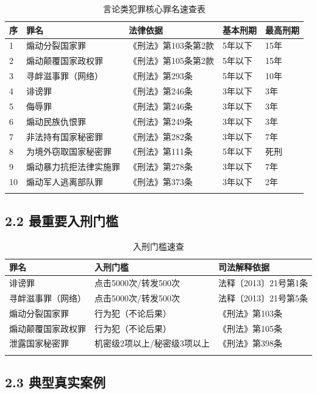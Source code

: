 \documentclass[12pt,a4paper]{article}
\begin{document}
\begin{longtable}{p{0.5cm}p{4cm}p{3cm}p{2cm}p{2cm}}
  \toprule
  \textbf{序} & \textbf{罪名} & \textbf{法律依据} & \textbf{基本刑期} & \textbf{最高刑期} \\
  \midrule
  1 & 煽动分裂国家罪 & 《刑法》第103条第2款 & 5年以下 & 15年 \\
  2 & 煽动颠覆国家政权罪 & 《刑法》第105条第2款 & 5年以下 & 15年 \\
  3 & 寻衅滋事罪（网络） & 《刑法》第293条 & 5年以下 & 10年 \\
  4 & 诽谤罪 & 《刑法》第246条 & 3年以下 & 3年 \\
  5 & 侮辱罪 & 《刑法》第246条 & 3年以下 & 3年 \\
  6 & 煽动民族仇恨罪 & 《刑法》第249条 & 3年以下 & 3年 \\
  7 & 非法持有国家秘密罪 & 《刑法》第282条 & 3年以下 & 7年 \\
  8 & 为境外窃取国家秘密罪 & 《刑法》第111条 & 5年以下 & 死刑 \\
  9 & 煽动暴力抗拒法律实施罪 & 《刑法》第278条 & 3年以下 & 7年 \\
  10 & 煽动军人逃离部队罪 & 《刑法》第373条 & 3年以下 & 2年 \\
  \bottomrule
  \caption{言论类犯罪核心罪名速查表}
\end{longtable}

\subsection{2.2 最重要入刑门槛}

\begin{longtable}{p{4cm}p{4cm}p{4cm}}
  \toprule
  \textbf{罪名} & \textbf{入刑门槛} & \textbf{司法解释依据} \\
  \midrule
  诽谤罪 & 点击5000次/转发500次 & 法释〔2013〕21号第1条 \\
  寻衅滋事罪（网络） & 点击5000次/转发500次 & 法释〔2013〕21号第5条 \\
  煽动分裂国家罪 & 行为犯（不论后果） & 《刑法》第103条 \\
  煽动颠覆国家政权罪 & 行为犯（不论后果） & 《刑法》第105条 \\
  泄露国家秘密罪 & 机密级2项以上/秘密级3项以上 & 《刑法》第398条 \\
  \bottomrule
  \caption{入刑门槛速查}
\end{longtable}

\subsection{2.3 典型真实案例}
\end{document}
